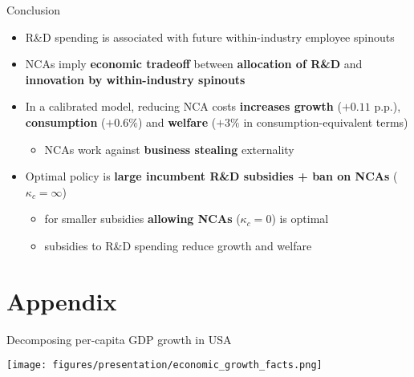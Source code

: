 \documentclass[english,usenames,dvipsnames]{beamer}
\begin{document}
\begin{frame}{Conclusion}
	\begin{itemize}
		\item R\&D spending is associated with future within-industry employee spinouts
		\medskip
		\item NCAs imply \alert{\textbf{economic tradeoff}} between \alert{\textbf{allocation of R\&D}} and \alert{\textbf{innovation by within-industry spinouts}}
		\medskip
		\item In a calibrated model, reducing NCA costs \alert{\textbf{increases growth }} ($+0.11$ p.p.), \alert{\textbf{consumption}} ($+0.6\%$) and \alert{\textbf{welfare}} ($+3\%$ in consumption-equivalent terms)
		\begin{itemize}
			\item NCAs work against \alert{\textbf{business stealing}} externality
		\end{itemize}
		\medskip
		\item Optimal policy is \alert{\textbf{large incumbent R\&D subsidies + ban on NCAs}} ($\kappa_c = \infty$)
		\begin{itemize}
			\item for smaller subsidies \alert{\textbf{allowing NCAs}} ($\kappa_c = 0$) is optimal
			\item subsidies to R\&D spending reduce growth and welfare
		\end{itemize}
	\end{itemize}
\end{frame}

\appendix

\section{Appendix}

\begin{frame}{Decomposing per-capita GDP growth in USA}\label{economic_growth_facts}\hyperlink{motivation_background}{}
	\begin{table}
		\texttt{[image: figures/presentation/economic\_growth\_facts.png]}
		\caption{Growth accounting (from Jones 2016, "The Facts of Economic Growth")}
	\end{table}
\end{frame}
\end{document}
